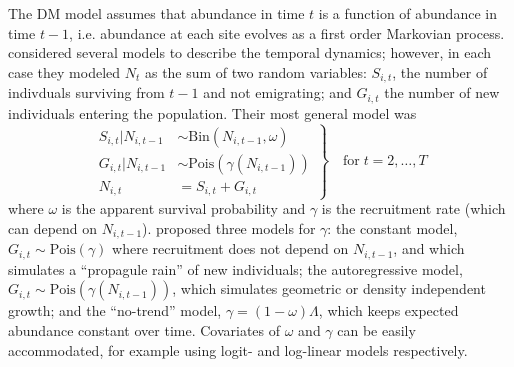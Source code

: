 \documentclass[12pt]{article}
\begin{document}
The DM model assumes that abundance in time $t$ is a function of
abundance in time $t-1$, i.e. abundance at each site evolves as a
first order Markovian process. %
\citet{dail_madsen:2011} considered several models to describe the temporal dynamics;
however, in each case they modeled $N_t$ as the sum of two random variables:
$S_{i,t}$, the number of indivduals surviving from $t-1$ and not
emigrating; and $G_{i,t}$ the number of new individuals entering
the population. Their most general model was
\begin{equation}
\left.\begin{aligned}
S_{i,t}|N_{i,t-1} &\sim \mathrm{Bin}(N_{i,t-1}, \omega) \\
G_{i,t}|N_{i,t-1} &\sim \mathrm{Pois}(\gamma(N_{i,t-1})) \\
N_{i,t} &= S_{i,t}+G_{i,t}
\end{aligned}\right\} \quad \text{for} \; t=2,\hdots,T
\label{eq:Nt}
\end{equation}
where $\omega$ is the apparent survival probability and $\gamma$
is the recruitment rate (which can depend on $N_{i,t-1}$).
\citet{dail_madsen:2011} proposed three
models for $\gamma$: the constant model,
$G_{i,t} \sim \mathrm{Pois}(\gamma)$ where recruitment does not
depend on $N_{i,t-1}$, and which simulates a ``propagule rain'' of new
individuals; the autoregressive model, $G_{i,t} \sim
\mathrm{Pois}(\gamma(N_{i,t-1}))$, which
simulates geometric or density independent growth; and the
``no-trend'' model, $\gamma = (1-\omega)\Lambda$, which keeps
expected abundance constant over time. Covariates of
$\omega$ and $\gamma$ can be easily accommodated, for example
using logit- and log-linear models respectively.

%
\end{document}
